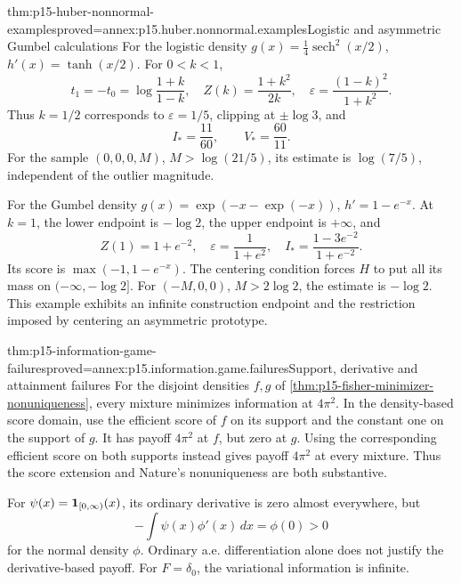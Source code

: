 \begin{hbtheorem}{thm:p15-huber-nonnormal-examples}{proved=annex:p15.huber.nonnormal.examples}{Logistic and asymmetric Gumbel calculations}
For the logistic density \(g(x)=\tfrac14\operatorname{sech}^2(x/2)\),
\(h'(x)=\tanh(x/2)\). For \(0<k<1\),
\[
 t_1=-t_0=\log\frac{1+k}{1-k},\quad
 Z(k)=\frac{1+k^2}{2k},\quad
 \varepsilon=\frac{(1-k)^2}{1+k^2}.
\]
Thus \(k=1/2\) corresponds to \(\varepsilon=1/5\), clipping at
\(\pm\log3\), and
\[
 I_*=\frac{11}{60},\qquad V_*=\frac{60}{11}.
\]
For the sample \((0,0,0,M)\), \(M>\log(21/5)\), its estimate is
\(\log(7/5)\), independent of the outlier magnitude.

For the Gumbel density \(g(x)=\exp(-x-\exp(-x))\), \(h'=1-e^{-x}\).
At \(k=1\), the lower endpoint is \(-\log2\), the upper endpoint
is \(+\infty\), and
\[
 Z(1)=1+e^{-2},\quad
 \varepsilon=\frac1{1+e^2},\quad
 I_*=\frac{1-3e^{-2}}{1+e^{-2}}.
\]
Its score is \(\max(-1,1-e^{-x})\).
The centering condition forces \(H\) to put all its mass on
\((-\infty,-\log2]\). For \((-M,0,0)\), \(M>2\log2\), the estimate
is \(-\log2\). This example exhibits an infinite construction endpoint
and the restriction imposed by centering an asymmetric prototype.
\end{hbtheorem}

\begin{hbtheorem}{thm:p15-information-game-failures}{proved=annex:p15.information.game.failures}{Support, derivative and attainment failures}
For the disjoint densities \(f,g\) of
\cref{thm:p15-fisher-minimizer-nonuniqueness}, every mixture minimizes
information at \(4\pi^2\).
In the density-based score domain, use the efficient score of \(f\)
on its support and the constant one on the support of \(g\).
It has payoff \(4\pi^2\) at \(f\), but zero at \(g\).
Using the corresponding efficient score on both supports instead
gives payoff \(4\pi^2\) at every mixture.
Thus the score extension and Nature's nonuniqueness are both substantive.

For \(\psi(x)={\bf1}_{[0,\infty)}(x)\), its ordinary derivative is
zero almost everywhere, but
\[
 -\int\psi(x)\phi'(x)\,dx=\phi(0)>0
\]
for the normal density \(\phi\). Ordinary a.e. differentiation alone
does not justify the derivative-based payoff.
For \(F=\delta_0\), the variational information is infinite.
\end{hbtheorem}

